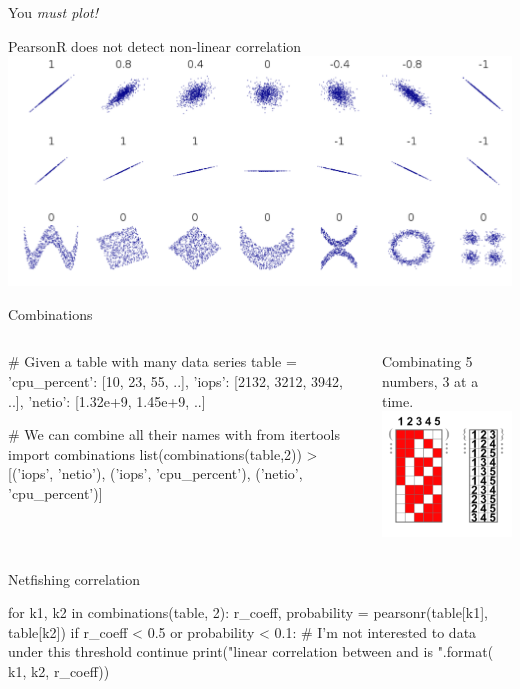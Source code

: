 \begin{pyframe}{You \emph{must plot!}}
\LARGE
\begin{center}
PearsonR does not detect non-linear correlation \\
\includegraphics[width=.8\textwidth]{correlation.pdf} \\
\end{center}
\end{pyframe}


\begin{pyframe}{Combinations } %
\begin{columns}
\begin{pycode}
# Given a table with many data series
table = {
  'cpu_percent': [10, 23, 55, ..],
  'iops': [2132, 3212, 3942, ..],
  'netio': [1.32e+9, 1.45e+9, ..]}

# We can combine all their names with
from itertools import combinations
list(combinations(table,2))
>[('iops', 'netio'), 
  ('iops', 'cpu_percent'), 
  ('netio', 'cpu_percent')]







\end{pycode}
Combinating 5 numbers, 3 at a time.
\includegraphics[width=4cm]{combinations_3.pdf}
\end{columns}
\end{pyframe}


\begin{pyframe}{Netfishing correlation}
\begin{pycode}
for k1, k2 in combinations(table, 2):
    r_coeff, probability = pearsonr(table[k1], table[k2])
    if r_coeff < 0.5 or probability < 0.1:
        # I'm not interested to data under this threshold
        continue
    print("linear correlation between {} and {} is {}".format(
        k1, k2, r_coeff))

\end{pycode}
\end{pyframe}

